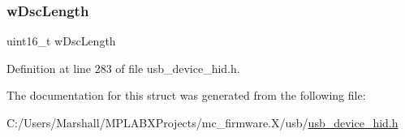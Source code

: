 \mbox{\label{struct___u_s_b___h_i_d___d_s_c___h_e_a_d_e_r_aba365ad44f648f09cd46a68dec863532}} 
\subsubsection{\texorpdfstring{wDscLength}{wDscLength}}
{\footnotesize\ttfamily uint16\+\_\+t w\+Dsc\+Length}



Definition at line 283 of file usb\+\_\+device\+\_\+hid.\+h.



The documentation for this struct was generated from the following file\+:\begin{DoxyCompactItemize}
\item 
C\+:/\+Users/\+Marshall/\+M\+P\+L\+A\+B\+X\+Projects/mc\+\_\+firmware.\+X/usb/\mbox{\hyperlink{usb__device__hid_8h}{usb\+\_\+device\+\_\+hid.\+h}}\end{DoxyCompactItemize}
